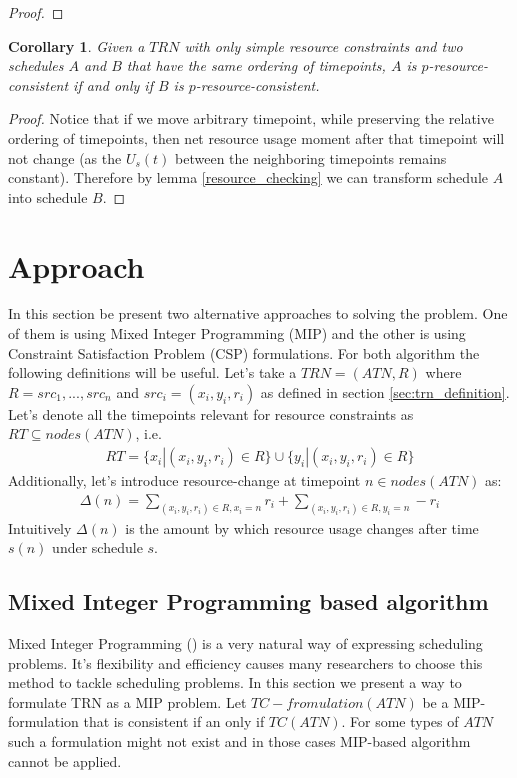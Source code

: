 \documentclass{article}
\newtheorem{corollary}{Corollary}[theorem]
\begin{document}
\begin{multicols}{2}
\begin{proof}
\end{proof}
\begin{corollary}
\label{cor:ordering}
Given a $TRN$ with only simple resource constraints and two schedules $A$ and $B$ that have the same ordering of timepoints, $A$ is $p$-resource-consistent if and only if $B$ is $p$-resource-consistent.
\end{corollary}
\begin{proof}
Notice that if we move arbitrary timepoint, while preserving the relative ordering of timepoints, then net resource usage moment after that timepoint will not change (as the $U_s(t)$ between the neighboring timepoints remains constant). Therefore by lemma \ref{resource_checking} we can transform schedule $A$ into schedule $B$.
\end{proof}


\section{Approach}
In this section be present two alternative approaches to solving the problem. One of them is using Mixed Integer Programming (MIP) and the other is using Constraint Satisfaction Problem (CSP) formulations. For both algorithm the following definitions will be useful.
Let's take a $TRN=(ATN, R)$ where $R={src_1, ..., src_n}$ and $src_i = (x_i, y_i, r_i)$ as defined in section \ref{sec:trn_definition}. Let's denote all the timepoints relevant for resource constraints as $RT \subseteq nodes(ATN)$, i.e.
\begin{align*}
RT = \{ x_i | (x_i, y_i, r_i) \in R \} \cup \{ y_i | (x_i, y_i, r_i) \in R \}
\end{align*}
Additionally, let's introduce resource-change at timepoint $n \in nodes(ATN)$ as:
\begin{align*}
\Delta(n) = \sum_{(x_i, y_i, r_i) \in R, x_i = n} r_i + \sum_{(x_i, y_i, r_i) \in R, y_i = n} -r_i
\end{align*}
Intuitively $\Delta(n)$ is the amount by which resource usage changes after time $s(n)$ under schedule $s$.
\subsection{Mixed Integer Programming based algorithm}
Mixed Integer Programming (\cite{markowitz1957solution}) is a very natural way of expressing scheduling problems. It's flexibility and efficiency causes many researchers to choose this method to tackle scheduling problems. In this section we present a way to formulate TRN as a MIP problem.  Let $TC-fromulation(ATN)$ be a MIP-formulation that is consistent if an only if $TC(ATN)$. For some types of $ATN$ such a formulation might not exist and in those cases MIP-based algorithm cannot be applied.


\end{multicols}
\end{document}
